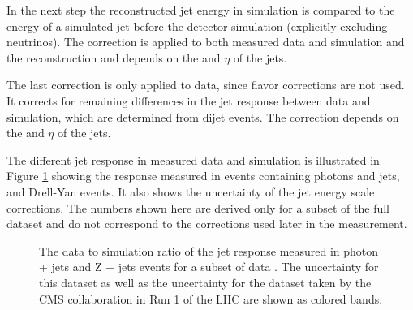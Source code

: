 In the next step the reconstructed jet energy in simulation is compared to the energy of a simulated jet before the detector simulation (explicitly excluding neutrinos).
The correction is applied to both measured data and simulation and the reconstruction and depends on the \pt and $\eta$ of the jets.

The last correction is only applied to data, since flavor corrections are not used. It corrects for remaining differences in the jet response between data and simulation, which are determined
from dijet events. The correction depends on the \pt and $\eta$ of the jets.

The different jet response in measured data and simulation is illustrated in Figure \ref{fig:reco_jetresponse} showing the response measured in events containing photons and jets, and Drell-Yan events.
It also shows the uncertainty of the jet energy scale corrections. The numbers shown here are derived only for a subset of the full dataset and do not correspond to the corrections used later in the measurement.

\begin{figure}[htbp!]
  \begin{center}
\caption{The data to simulation ratio of the jet response measured in photon + jets and Z + jets events for a subset of data \cite{CMS-DP-2016-020}. The uncertainty for this dataset as well as the uncertainty for the dataset taken by the CMS collaboration
in Run 1 of the LHC are shown as colored bands. 
  \label{fig:reco_jetresponse}}
  \end{center}
\end{figure}



